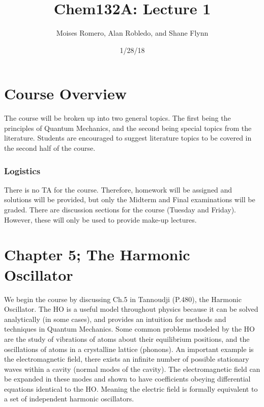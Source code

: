 \documentclass{article}
\title{Chem132A: Lecture 1}
\date{1/28/18}
\author{Moises Romero, Alan Robledo, and Shane Flynn}
\begin{document}
\maketitle

\section*{Course Overview}
The course will be broken up into two general topics.
The first being the principles of Quantum Mechanics, and the second being special topics from the literature.
Students are encouraged to suggest literature topics to be covered in the second half of the course.

\subsubsection*{Logistics}
There is no TA for the course. Therefore, homework will be assigned and solutions will be provided, but only the Midterm and Final examinations will be graded.
There are discussion sections for the course (Tuesday and Friday). However, these will only be used to provide make-up lectures.

\section*{Chapter 5; The Harmonic Oscillator}
We begin the course by discussing Ch.5 in Tannoudji (P.480), the Harmonic Oscillator.
The HO is a useful model throughout physics because it can be solved analytically (in some cases), and provides an intuition for methods and techniques in Quantum Mechanics.
Some common problems modeled by the HO are the study of vibrations of atoms about their equilibrium positions, and the oscillations of atoms in a crystalline lattice (phonons).
An important example is the electromagnetic field, there  exists an  infinite number of possible stationary waves within a cavity (normal modes of the cavity).
The electromagnetic field can be expanded in these modes and shown to have coefficients obeying differential equations identical to the HO.
Meaning the electric field is formally equivalent to a set of independent harmonic oscillators.
\end{document}
